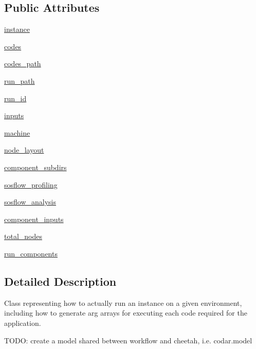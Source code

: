 \subsection*{Public Attributes}
\begin{DoxyCompactItemize}
\item 
\hyperlink{classcodar_1_1cheetah_1_1model_1_1_run_af2c8be223aa9290089e020cffec6f531}{instance}
\item 
\hyperlink{classcodar_1_1cheetah_1_1model_1_1_run_a3d4ea1b22ffc7b7cecd6b7ee0e48301e}{codes}
\item 
\hyperlink{classcodar_1_1cheetah_1_1model_1_1_run_ad61ae023de5960c8bdbfd8437daafda2}{codes\+\_\+path}
\item 
\hyperlink{classcodar_1_1cheetah_1_1model_1_1_run_a33e213b156b3b22e68738ce5c0942044}{run\+\_\+path}
\item 
\hyperlink{classcodar_1_1cheetah_1_1model_1_1_run_ac8268174ba2fba6a0f8437d44f991331}{run\+\_\+id}
\item 
\hyperlink{classcodar_1_1cheetah_1_1model_1_1_run_a9b663454e66c7bd398e7f5f4bf9fcbed}{inputs}
\item 
\hyperlink{classcodar_1_1cheetah_1_1model_1_1_run_a1be34ccf48758dc37ffde2d5d2680bfa}{machine}
\item 
\hyperlink{classcodar_1_1cheetah_1_1model_1_1_run_a564be04cf0e1030d650f3ba89764e102}{node\+\_\+layout}
\item 
\hyperlink{classcodar_1_1cheetah_1_1model_1_1_run_a1d1e212876736c32d9c2bb446f79a655}{component\+\_\+subdirs}
\item 
\hyperlink{classcodar_1_1cheetah_1_1model_1_1_run_ac73191d8724dfa774f8c52df30007c11}{sosflow\+\_\+profiling}
\item 
\hyperlink{classcodar_1_1cheetah_1_1model_1_1_run_a5713827ad4bde77d4fcf46c05f10b554}{sosflow\+\_\+analysis}
\item 
\hyperlink{classcodar_1_1cheetah_1_1model_1_1_run_aef7a539e9aa216737394edbdcf0ea726}{component\+\_\+inputs}
\item 
\hyperlink{classcodar_1_1cheetah_1_1model_1_1_run_a441a213a4a37f8cde9db77ecb9a72e89}{total\+\_\+nodes}
\item 
\hyperlink{classcodar_1_1cheetah_1_1model_1_1_run_a88ee35c04cfd039b398f131a50949305}{run\+\_\+components}
\end{DoxyCompactItemize}


\subsection{Detailed Description}
\begin{DoxyVerb}Class representing how to actually run an instance on a given environment,
including how to generate arg arrays for executing each code required for
the application.

TODO: create a model shared between workflow and cheetah, i.e. codar.model
\end{DoxyVerb}
 

